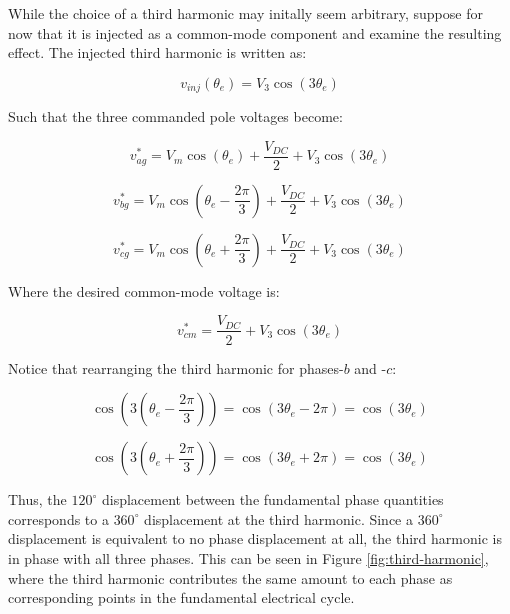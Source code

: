 \documentclass{article}
\begin{document}
While the choice of a third harmonic may initally seem arbitrary, suppose for now that it is injected as a common-mode component and examine the resulting effect. The injected third harmonic is written as:

\begin{equation}
    v_{inj}(\theta_e) = V_3\cos(3\theta_e)
\end{equation}

Such that the three commanded pole voltages become:

\begin{equation}
    v_{ag}^* = V_m\cos(\theta_e) + \frac{V_{DC}}{2} + V_3\cos(3\theta_e)
\end{equation}

\begin{equation}
    v_{bg}^* = V_m\cos(\theta_e - \frac{2\pi}{3}) + \frac{V_{DC}}{2} + V_3\cos(3\theta_e)
\end{equation}

\begin{equation}
    v_{cg}^* = V_m\cos(\theta_e + \frac{2\pi}{3}) + \frac{V_{DC}}{2} + V_3\cos(3\theta_e)
\end{equation}

Where the desired common-mode voltage is:

\begin{equation}
    v_{cm}^* = \frac{V_{DC}}{2} + V_3\cos(3\theta_e)
\end{equation}

Notice that rearranging the third harmonic for phases-$b$ and -$c$:

\begin{equation}
    \cos(3(\theta_e - \frac{2\pi}{3})) = \cos(3\theta_e - 2\pi) = \cos(3\theta_e)
\end{equation}

\begin{equation}
    \cos(3(\theta_e + \frac{2\pi}{3})) = \cos(3\theta_e + 2\pi) = \cos(3\theta_e)
\end{equation}

Thus, the $120^\circ$ displacement between the fundamental phase quantities corresponds to a $360^\circ$ displacement at the third harmonic. Since a $360^\circ$ displacement is equivalent to no phase displacement at all, the third harmonic is in phase with all three phases. This can be seen in Figure \ref{fig:third-harmonic}, where the third harmonic contributes the same amount to each phase as corresponding points in the fundamental electrical cycle.
\end{document}

